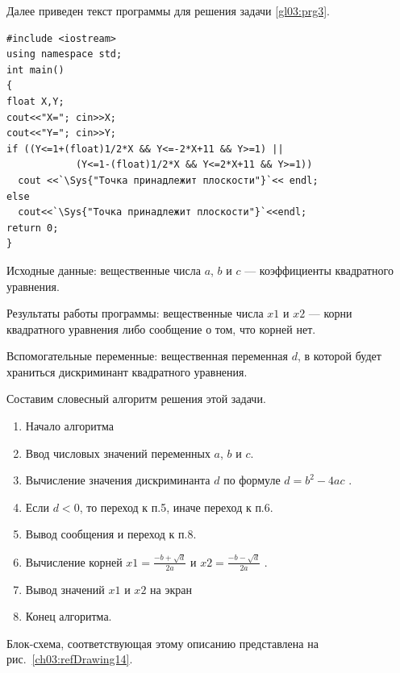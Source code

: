Далее приведен текст программы для решения задачи \ref{gl03:prg3}.

\begin{lstlisting}
#include <iostream>
using namespace std;
int main()
{
float X,Y;
cout<<"X="; cin>>X;
cout<<"Y="; cin>>Y;
if ((Y<=1+(float)1/2*X && Y<=-2*X+11 && Y>=1) ||
            (Y<=1-(float)1/2*X && Y<=2*X+11 && Y>=1))
  cout <<`\Sys{"Точка принадлежит плоскости"}`<< endl;
else
  cout<<`\Sys{"Точка принадлежит плоскости"}`<<endl;
return 0;
}
\end{lstlisting}


Исходные данные: вещественные числа $a$, $b$ и $c$ --- коэффициенты
квадратного уравнения.

Результаты работы программы: вещественные числа $x1$ и $x2$ --- корни квадратного
уравнения либо сообщение о том, что корней нет.

Вспомогательные переменные: вещественная переменная $d$, в которой будет храниться дискриминант
квадратного уравнения.

Составим словесный алгоритм решения этой задачи.
\begin{enumerate}
\item Начало алгоритма
\item Ввод числовых значений переменных $a$, $b$ и $c$.
\item Вычисление значения дискриминанта $d$ по формуле  $d=b^2-4ac$ .
\item Если $d<0$, то переход к п.5, иначе переход к п.6.
\item Вывод сообщения  и переход к п.8.
\item Вычисление корней  $x1=\frac{-b+\sqrt{d}}{2a}$  и  $x2=\frac{-b-\sqrt{d}}{2a}$ .
\item Вывод значений $x1$ и $x2$ на экран
\item Конец алгоритма.
\end{enumerate}
Блок-схема, соответствующая этому описанию представлена на рис.~\ref{ch03:refDrawing14}.

